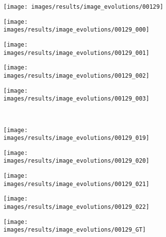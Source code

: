 \begin{figure}[t]
 \centering
 \begin{subfigure}[c]{0.19\textwidth}
  \centering
  \texttt{[image: images/results/image\_evolutions/00129]}
 \end{subfigure}
 \begin{subfigure}[c]{0.19\textwidth}
  \centering
  \texttt{[image: images/results/image\_evolutions/00129\_000]}
 \end{subfigure}
 \begin{subfigure}[c]{0.19\textwidth}
  \centering
  \texttt{[image: images/results/image\_evolutions/00129\_001]}
 \end{subfigure}
 \begin{subfigure}[c]{0.19\textwidth}
  \centering
  \texttt{[image: images/results/image\_evolutions/00129\_002]}
 \end{subfigure}
 \begin{subfigure}[c]{0.19\textwidth}
  \centering
  \texttt{[image: images/results/image\_evolutions/00129\_003]}
 \end{subfigure}
 \\
 \begin{subfigure}[c]{0.19\textwidth}
  \centering
  \texttt{[image: images/results/image\_evolutions/00129\_019]}
 \end{subfigure}
 \begin{subfigure}[c]{0.19\textwidth}
  \centering
  \texttt{[image: images/results/image\_evolutions/00129\_020]}
 \end{subfigure}
 \begin{subfigure}[c]{0.19\textwidth}
  \centering
  \texttt{[image: images/results/image\_evolutions/00129\_021]}
 \end{subfigure}
 \begin{subfigure}[c]{0.19\textwidth}
  \centering
  \texttt{[image: images/results/image\_evolutions/00129\_022]}
 \end{subfigure}
 \begin{subfigure}[c]{0.19\textwidth}
  \centering
  \texttt{[image: images/results/image\_evolutions/00129\_GT]}
 \end{subfigure}
 \\
 

\end{figure}
